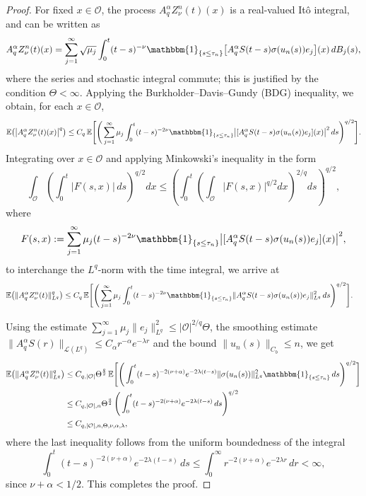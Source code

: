 \documentclass[10pt]{article}
\numberwithin{figure}{section}
\numberwithin{equation}{section}
\newcommand{\0}{{\theta}}
\def\be{\begin{equation}}
\def\ee{\end{equation}}
\def\sig{\sigma}
\def\E{\mathbb{E}}
\begin{document}
\begin{proof}
 For fixed $x\in\mathcal O$, the process $A_q^\alpha Z_\nu^n(t)(x)$ is a real-valued It\^o integral, and can be written as
$$
A_q^\alpha Z_\nu^n(t)(x)
=\sum_{j=1}^\infty\sqrt{\mu_j}\int_0^t(t-s)^{-\nu}\mathbbm{1}_{\{s\le\tau_n\}}
\big[A_q^\alpha S(t-s)\sigma(u_n(s))e_j\big](x)\,dB_j(s),
$$
where the series and stochastic integral commute; this is justified by the condition $\Theta<\infty$. Applying the Burkholder--Davis--Gundy (BDG) inequality, we obtain, for each $x\in\mathcal O$,
$$
\mathbb{E}\big(\big|A_q^\alpha Z_\nu^n(t)(x)\big|^q\big)
\le C_q\,\mathbb{E}\Bigg[\Bigg(\sum_{j=1}^\infty\mu_j
\int_0^t(t-s)^{-2\nu}\mathbbm{1}_{\{s\le\tau_n\}}
\big|[A_q^\alpha S(t-s)\sigma(u_n(s))e_j](x)\big|^2\,ds\Bigg)^{q/2}\Bigg].
$$
Integrating over $x\in\mathcal O$ and applying Minkowski's inequality in the form
$$
\int_{\mathcal O}\left(\int_0^t |F(s,x)|\,ds\right)^{q/2}dx
\le
\left(\int_0^t \left(\int_{\mathcal O} |F(s,x)|^{q/2}dx\right)^{2/q}ds\right)^{q/2},
$$
where
$$
F(s,x):=\sum_{j=1}^\infty\mu_j(t-s)^{-2\nu}\mathbbm{1}_{\{s\le\tau_n\}}
\big|[A_q^\alpha S(t-s)\sigma(u_n(s))e_j](x)\big|^2,
$$
to interchange the $L^q$-norm with the time integral, we arrive at
$$
\begin{aligned}
\mathbb{E}\big(\|A_q^\alpha Z_\nu^n(t)\|_{L^q}^q\big)
&\le C_q\,\mathbb{E}\Bigg[\Bigg(\sum_{j=1}^\infty\mu_j
\int_0^t(t-s)^{-2\nu}\mathbbm{1}_{\{s\le\tau_n\}}
\|A_q^\alpha S(t-s)\sigma(u_n(s))e_j\|_{L^q}^2\,ds\Bigg)^{q/2}\Bigg].
\end{aligned}
$$



Using the estimate $\sum_{j=1}^\infty\mu_j\|e_j\|_{L^q}^2\le |\mathcal O|^{2/q}\Theta$, the smoothing estimate $\|A_q^\alpha S(r)\|_{\mathcal L(L^q)}\le C_\alpha r^{-\alpha}e^{-\lambda r}$ and the bound $\|u_n(s)\|_{C_b}\le n$, we get
\be\label{eq3.6}
\begin{aligned}
\mathbb{E}\big(\|A_q^\alpha Z_\nu^n(t)\|_{L^q}^q\big)
&\le C_{q,|\mathcal O|}\Theta^\frac{q}{2}\,
\E\Bigg[\Bigg(\int_0^t(t-s)^{-2(\nu+\alpha)}e^{-2\lambda(t-s)}\|\sig(u_n(s))\|_{L^q}^2\mathbbm{1}_{\{s\le\tau_n\}}\,ds\Bigg)^{q/2}\Bigg] \\
&\le C_{q,|\mathcal O|,n}\Theta^\frac{q}{2}\,
\Bigg(\int_0^t(t-s)^{-2(\nu+\alpha)}e^{-2\lambda(t-s)}\,ds\Bigg)^{q/2} \\&\le C_{q,|\mathcal O|,n,\Theta,\nu,\alpha,\lambda},
\end{aligned}
\ee
where the last inequality follows from the uniform boundedness of the integral
$$
\int_0^t(t-s)^{-2(\nu+\alpha)}e^{-2\lambda(t-s)}\,ds
\le \int_0^\infty r^{-2(\nu+\alpha)}e^{-2\lambda r}\,dr < \infty,
$$
since $\nu+\alpha<1/2$. This completes the proof.
\end{proof}
\end{document}
